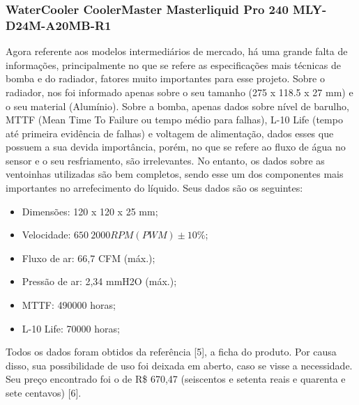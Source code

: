 \subsubsection{WaterCooler CoolerMaster Masterliquid Pro 240 MLY-D24M-A20MB-R1}

Agora referente aos modelos intermediários de mercado, há uma grande falta de informações, principalmente no que se refere as especificações mais técnicas de bomba e do radiador, fatores muito importantes para esse projeto. Sobre o radiador, nos foi informado apenas sobre o seu tamanho (275 x 118.5 x 27 mm) e o seu material (Alumínio). Sobre a bomba, apenas dados sobre nível de barulho, MTTF (Mean Time To Failure ou tempo médio para falhas), L-10 Life (tempo até primeira evidência de falhas) e voltagem de alimentação, dados esses que possuem a sua devida importância, porém, no que se refere ao fluxo de água no sensor e o seu resfriamento, são irrelevantes.
No entanto, os dados sobre as ventoinhas utilizadas são bem completos, sendo esse um dos componentes mais importantes no arrefecimento do líquido. Seus dados são os seguintes:

\begin{itemize}
\item Dimensões: 120 x 120 x 25 mm;
\item Velocidade: $650 ~ 2000 RPM (PWM) \pm 10$\%;
\item Fluxo de ar: 66,7 CFM (máx.);
\item Pressão de ar: 2,34 mmH2O (máx.);
\item MTTF: 490000 horas;
\item L-10 Life: 70000 horas;
\end{itemize}

Todos os dados foram obtidos da referência [5], a ficha do produto. Por causa disso, sua possibilidade de uso foi deixada em aberto, caso se visse a necessidade. Seu preço encontrado foi o de R\$ 670,47 (seiscentos e setenta reais e quarenta e sete centavos) [6].


